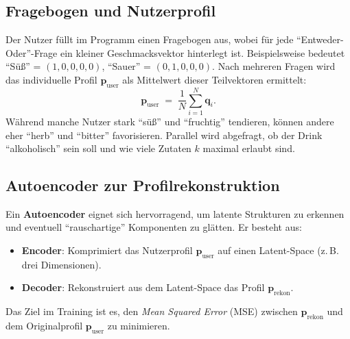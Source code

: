 \documentclass[12pt,a4paper]{report}
\begin{document}
\subsection{Fragebogen und Nutzerprofil}
Der Nutzer füllt im Programm einen Fragebogen aus, wobei für jede \enquote{Entweder-Oder}-Frage ein kleiner Geschmacksvektor hinterlegt ist. Beispielsweise bedeutet \enquote{Süß} = \((1,0,0,0,0)\), \enquote{Sauer} = \((0,1,0,0,0)\). Nach mehreren Fragen wird das individuelle Profil \(\mathbf{p}_{\text{user}}\) als Mittelwert dieser Teilvektoren ermittelt:
\[
\mathbf{p}_{\text{user}} \;=\; \frac{1}{N} \sum_{i=1}^{N} \mathbf{q}_i.
\]
Während manche Nutzer stark \enquote{süß} und \enquote{fruchtig} tendieren, können andere eher \enquote{herb} und \enquote{bitter} favorisieren. Parallel wird abgefragt, ob der Drink \enquote{alkoholisch} sein soll und wie viele Zutaten \(k\) maximal erlaubt sind.

\subsection{Autoencoder zur Profilrekonstruktion}
Ein \textbf{Autoencoder} eignet sich hervorragend, um latente Strukturen zu erkennen und eventuell \enquote{rauschartige} Komponenten zu glätten. Er besteht aus:
\begin{itemize}
  \item \textbf{Encoder}: Komprimiert das Nutzerprofil \(\mathbf{p}_{\text{user}}\) auf einen Latent-Space (z.\,B. drei Dimensionen).
  \item \textbf{Decoder}: Rekonstruiert aus dem Latent-Space das Profil \(\mathbf{p}_{\text{rekon}}\).
\end{itemize}
Das Ziel im Training ist es, den \textit{Mean Squared Error} (MSE) zwischen \(\mathbf{p}_{\text{rekon}}\) und dem Originalprofil \(\mathbf{p}_{\text{user}}\) zu minimieren.
\end{document}
